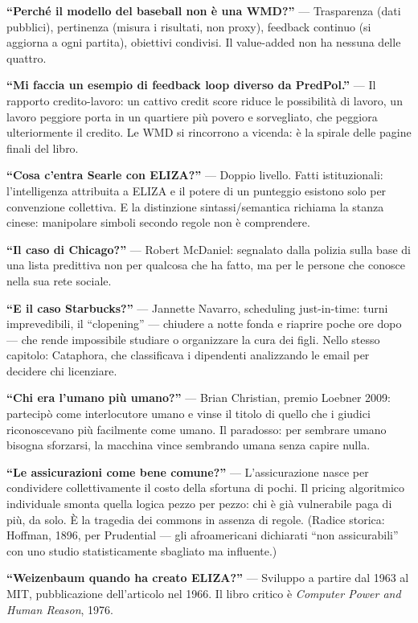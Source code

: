 \documentclass[a4paper,11pt]{article}
\newcommand{\qa}[2]{\textbf{``#1''} --- #2\par\smallskip}
\begin{document}
\qa{Perché il modello del baseball non è una WMD?}{Trasparenza (dati pubblici), pertinenza (misura i risultati, non proxy), feedback continuo (si aggiorna a ogni partita), obiettivi condivisi. Il value-added non ha nessuna delle quattro.}

\qa{Mi faccia un esempio di feedback loop diverso da PredPol.}{Il rapporto credito-lavoro: un cattivo credit score riduce le possibilità di lavoro, un lavoro peggiore porta in un quartiere più povero e sorvegliato, che peggiora ulteriormente il credito. Le WMD si rincorrono a vicenda: è la spirale delle pagine finali del libro.}

\qa{Cosa c'entra Searle con ELIZA?}{Doppio livello. Fatti istituzionali: l'intelligenza attribuita a ELIZA e il potere di un punteggio esistono solo per convenzione collettiva. E la distinzione sintassi/semantica richiama la stanza cinese: manipolare simboli secondo regole non è comprendere.}

\qa{Il caso di Chicago?}{Robert McDaniel: segnalato dalla polizia sulla base di una lista predittiva non per qualcosa che ha fatto, ma per le persone che conosce nella sua rete sociale.}

\qa{E il caso Starbucks?}{Jannette Navarro, scheduling just-in-time: turni imprevedibili, il ``clopening'' --- chiudere a notte fonda e riaprire poche ore dopo --- che rende impossibile studiare o organizzare la cura dei figli. Nello stesso capitolo: Cataphora, che classificava i dipendenti analizzando le email per decidere chi licenziare.}

\qa{Chi era l'umano più umano?}{Brian Christian, premio Loebner 2009: partecipò come interlocutore umano e vinse il titolo di quello che i giudici riconoscevano più facilmente come umano. Il paradosso: per sembrare umano bisogna sforzarsi, la macchina vince sembrando umana senza capire nulla.}

\qa{Le assicurazioni come bene comune?}{L'assicurazione nasce per condividere collettivamente il costo della sfortuna di pochi. Il pricing algoritmico individuale smonta quella logica pezzo per pezzo: chi è già vulnerabile paga di più, da solo. È la tragedia dei commons in assenza di regole. (Radice storica: Hoffman, 1896, per Prudential --- gli afroamericani dichiarati ``non assicurabili'' con uno studio statisticamente sbagliato ma influente.)}

\qa{Weizenbaum quando ha creato ELIZA?}{Sviluppo a partire dal 1963 al MIT, pubblicazione dell'articolo nel 1966. Il libro critico è \emph{Computer Power and Human Reason}, 1976.}
\end{document}
